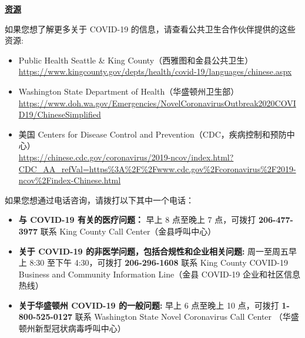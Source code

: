 \documentclass[10pt]{article}
\begin{document}
\bigskip

\large \underline{\textbf{资源}}

如果您想了解更多关于 COVID-19 的信息，请查看公共卫生合作伙伴提供的这些资源:

\begin{itemize}
\item
  Public Health \textemdash Seattle \& King County（西雅图和金县公共卫生）\\
  \url{https://www.kingcounty.gov/depts/health/covid-19/languages/chinese.aspx}

\item

  Washington State Department of Health（华盛顿州卫生部）\\
  \url{https://www.doh.wa.gov/Emergencies/NovelCoronavirusOutbreak2020COVID19/ChineseSimplified}

\item
  美国 Centers for Disease Control and Prevention（CDC，疾病控制和预防中心）\\
  \url{https://chinese.cdc.gov/coronavirus/2019-ncov/index.html?CDC\_AA\_refVal=https%3A%2F%2Fwww.cdc.gov%2Fcoronavirus%2F2019-ncov%2Findex-Chinese.html}

\end{itemize}

如果您想通过电话咨询，请拨打以下其中一个电话：

\begin{itemize}

\item

  \textbf{与 COVID-19 有关的医疗问题：} 早上 8 点至晚上 7 点，可拨打
  \textbf{206-477-3977} 联系 King County Call Center（金县呼叫中心）

\item

  \textbf{关于 COVID-19 的非医学问题，包括合规性和企业相关问题:} 周一至周五早上 8:30
  至下午 4:30，可拨打 \textbf{206-296-1608} 联系 King County COVID-19 Business and
  Community Information Line（金县 COVID-19 企业和社区信息热线）

\item

  \textbf{关于华盛顿州 COVID-19 的一般问题:} 早上 6 点至晚上 10 点，可拨打
  \textbf{1-800-525-0127} 联系 Washington State Novel Coronavirus Call Center
  （华盛顿州新型冠状病毒呼叫中心）

\end{itemize}

\bigskip
\end{document}
